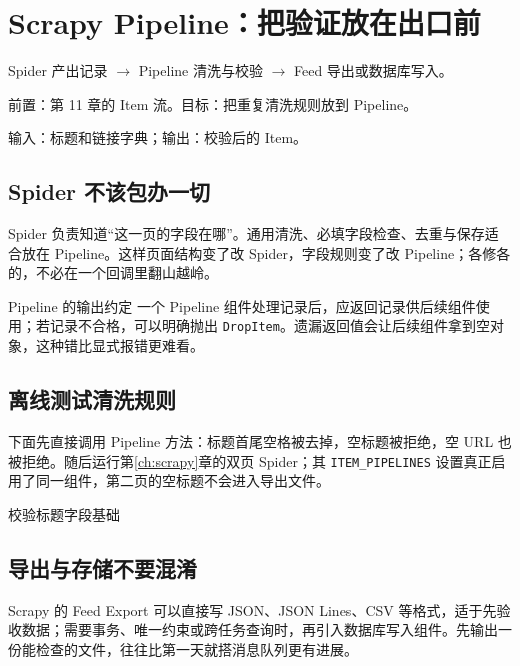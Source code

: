 \chapter{Scrapy Pipeline：把验证放在出口前}\label{ch:pipeline}
\begin{tcolorbox}[title=章首知识地图,colframe=Ink]
Spider 产出记录 $\longrightarrow$ Pipeline 清洗与校验 $\longrightarrow$ Feed 导出或数据库写入。
\end{tcolorbox}

\begin{tcolorbox}[title=学习目标与前置知识,colframe=Ink!65,colback=Ink!2]
前置：第 11 章的 Item 流。目标：把重复清洗规则放到 Pipeline。\par
输入：标题和链接字典；输出：校验后的 Item。
\end{tcolorbox}

\section{Spider 不该包办一切}
Spider 负责知道“这一页的字段在哪”。通用清洗、必填字段检查、去重与保存适合放在 Pipeline。这样页面结构变了改 Spider，字段规则变了改 Pipeline；各修各的，不必在一个回调里翻山越岭。

\begin{definition}{Pipeline 的输出约定}
一个 Pipeline 组件处理记录后，应返回记录供后续组件使用；若记录不合格，可以明确抛出 \texttt{DropItem}。遗漏返回值会让后续组件拿到空对象，这种错比显式报错更难看。
\end{definition}

\section{离线测试清洗规则}
下面先直接调用 Pipeline 方法：标题首尾空格被去掉，空标题被拒绝，空 URL 也被拒绝。随后运行第\ref{ch:scrapy}章的双页 Spider；其 \texttt{ITEM\_PIPELINES} 设置真正启用了同一组件，第二页的空标题不会进入导出文件。

\begin{example}{校验标题字段}{基础}
\end{example}

\section{导出与存储不要混淆}
Scrapy 的 Feed Export 可以直接写 JSON、JSON Lines、CSV 等格式，适于先验收数据；需要事务、唯一约束或跨任务查询时，再引入数据库写入组件。先输出一份能检查的文件，往往比第一天就搭消息队列更有进展。

